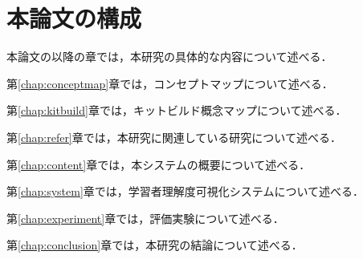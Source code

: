 \section{本論文の構成}
本論文の以降の章では，本研究の具体的な内容について述べる．

第\ref{chap:conceptmap}章では，コンセプトマップについて述べる．

第\ref{chap:kitbuild}章では，キットビルド概念マップについて述べる．

第\ref{chap:refer}章では，本研究に関連している研究について述べる．

第\ref{chap:content}章では，本システムの概要について述べる．

第\ref{chap:system}章では，学習者理解度可視化システムについて述べる．

第\ref{chap:experiment}章では，評価実験について述べる．

第\ref{chap:conclusion}章では，本研究の結論について述べる．